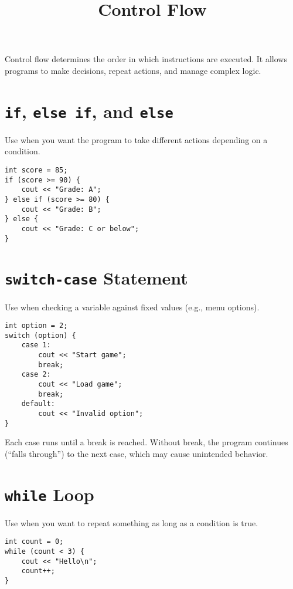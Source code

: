 \documentclass{article}
\title{Control Flow}
\author{}
\date{}
\begin{document}
\maketitle


Control flow determines the order in which instructions are executed. It allows programs to make decisions, repeat actions, and manage complex logic.

\section{\texttt{if}, \texttt{else if}, and \texttt{else}}

Use when you want the program to take different actions depending on a condition.

\begin{lstlisting}[style=cppstyle]
int score = 85;
if (score >= 90) {
    cout << "Grade: A";
} else if (score >= 80) {
    cout << "Grade: B";
} else {
    cout << "Grade: C or below";
}
\end{lstlisting}

\section{\texttt{switch-case} Statement}

Use when checking a variable against fixed values (e.g., menu options).

\begin{lstlisting}[style=cppstyle]
int option = 2;
switch (option) {
    case 1:
        cout << "Start game";
        break;
    case 2:
        cout << "Load game";
        break;
    default:
        cout << "Invalid option";
}
\end{lstlisting}

Each case runs until a break is reached. Without break, the program continues (“falls through”) to the next case, which may cause unintended behavior.

\section{\texttt{while} Loop}

Use when you want to repeat something as long as a condition is true.

\begin{lstlisting}[style=cppstyle]
int count = 0;
while (count < 3) {
    cout << "Hello\n";
    count++;
}
\end{lstlisting}
\end{document}
